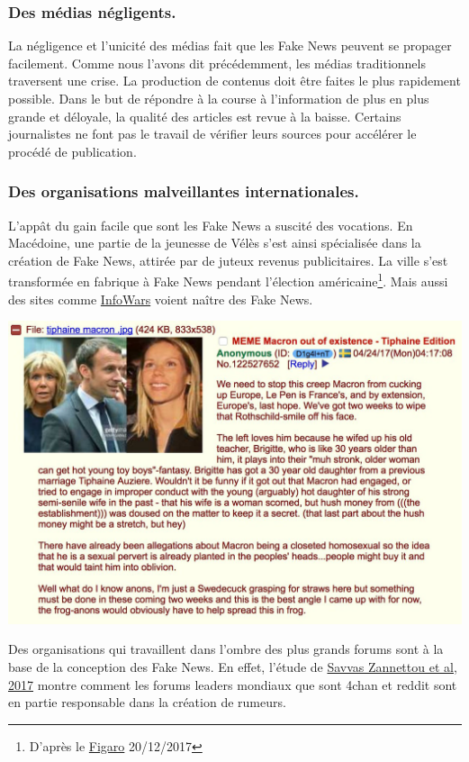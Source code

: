 \subsubsection{Des médias négligents.}
La négligence et l'unicité des médias fait que les Fake News peuvent se propager facilement.
Comme nous l'avons dit précédemment, les médias traditionnels traversent une crise.
La production de contenus doit être faites le plus rapidement possible.
Dans le but de répondre à la course à l'information de plus en plus grande et déloyale, la qualité des articles est revue à la baisse.
Certains journalistes ne font pas le travail de vérifier leurs sources pour accélérer le procédé de publication.



\subsubsection{Des organisations malveillantes internationales.}
L'appât du gain facile que sont les Fake News a suscité des vocations.
En Macédoine, une partie de la jeunesse de Vélès s'est ainsi spécialisée dans la création de Fake News, attirée par de juteux revenus publicitaires. La ville s'est transformée en fabrique à Fake News pendant l'élection américaine\footnote{D'après le \href{http://www.lefigaro.fr/actualite-france/2017/03/06/01016-20170306ARTFIG00187-fake-news-un-meme-terme-pour-plusieurs-realites.php}{Figaro} 20/12/2017 }.
Mais aussi des sites comme \href{https://www.infowars.com/}{InfoWars} voient naître des Fake News.

\begin{center}
 \includegraphics[scale=0.20]{../../img/rumeur_4chan/macron.jpg}
 \label{macron}
\end{center}

Des organisations qui travaillent dans l'ombre des plus grands forums sont à la base de la conception des Fake News.
En effet, l'étude de \href{https://arxiv.org/abs/1705.06947}{Savvas Zannettou et al, 2017} montre comment les forums leaders mondiaux que sont 4chan et reddit sont en partie responsable dans la création de rumeurs.
